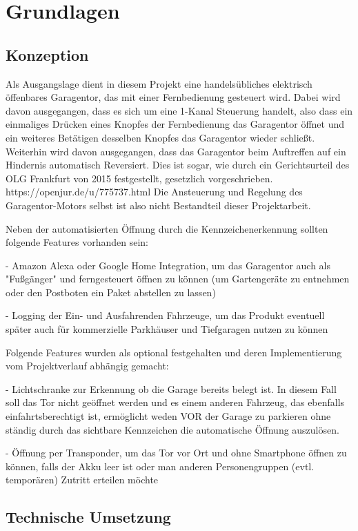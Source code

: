 \chapter{Grundlagen}
\section{Konzeption}
Als Ausgangslage dient in diesem Projekt eine handelsübliches elektrisch öffenbares Garagentor, das mit einer Fernbedienung gesteuert wird. Dabei wird davon ausgegangen, dass es sich um eine 1-Kanal Steuerung handelt, also dass ein einmaliges Drücken eines Knopfes der Fernbedienung das Garagentor öffnet und ein weiteres Betätigen desselben Knopfes das Garagentor wieder schließt. Weiterhin wird davon ausgegangen, dass das Garagentor beim Auftreffen auf ein Hindernis automatisch Reversiert. Dies ist sogar, wie durch ein Gerichtsurteil des OLG Frankfurt von 2015 festgestellt, gesetzlich vorgeschrieben.  https://openjur.de/u/775737.html
Die Ansteuerung und Regelung des Garagentor-Motors selbst ist also nicht Bestandteil dieser Projektarbeit.

Neben der automatisierten Öffnung durch die Kennzeichenerkennung sollten folgende Features vorhanden sein:

- Amazon Alexa oder Google Home Integration, um das Garagentor auch als "Fußgänger" und ferngesteuert öffnen zu können (um Gartengeräte zu entnehmen oder den Postboten ein Paket abstellen zu lassen)

- Logging der Ein- und Ausfahrenden Fahrzeuge, um das Produkt eventuell später auch für kommerzielle Parkhäuser und Tiefgaragen nutzen zu können

Folgende Features wurden als optional festgehalten und deren Implementierung vom Projektverlauf abhängig gemacht:

- Lichtschranke zur Erkennung ob die Garage bereits belegt ist. In diesem Fall soll das Tor nicht geöffnet werden und es einem anderen Fahrzeug, das ebenfalls einfahrtsberechtigt ist, ermöglicht weden VOR der Garage zu parkieren ohne ständig durch das sichtbare Kennzeichen die automatische Öffnung auszulösen.

- Öffnung per Transponder, um das Tor vor Ort und ohne Smartphone öffnen zu können, falls der Akku leer ist oder man anderen Personengruppen (evtl. temporären) Zutritt erteilen möchte

\section{Technische Umsetzung}

